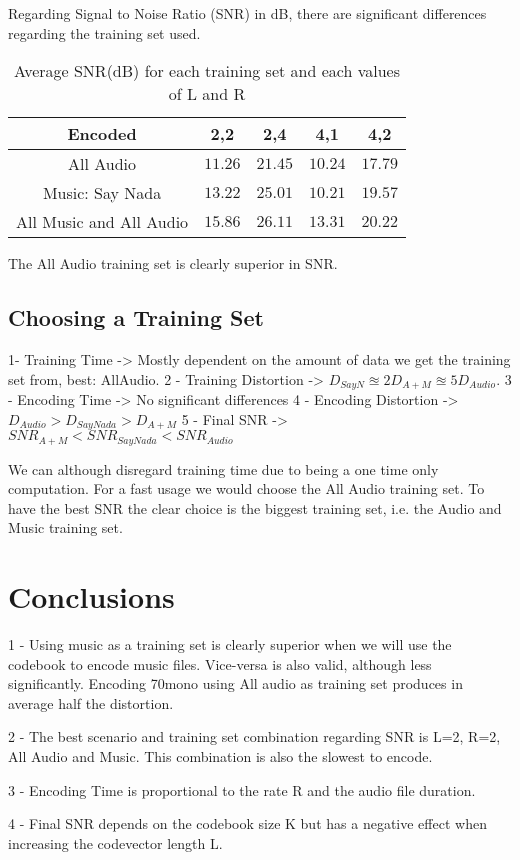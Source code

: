 \documentclass[a4paper, 11pt]{article}
\begin{document}
		Regarding Signal to Noise Ratio (SNR) in dB, there are significant differences regarding the training set used.
		
		\begin{table}[H]
			\centering
			\begin{tabular}{c|c|c|c|c}
				\textbf{Encoded} 			& \textbf{2,2} 	& \textbf{2,4}	& \textbf{4,1}	& \textbf{4,2} \\ \hline
				All Audio 					& $ 11.26 $ 	& $ 21.45 $		& $ 10.24 $ 	& $ 17.79 $	\\ \hline
				Music: Say Nada				& $ 13.22 $		& $ 25.01 $		& $ 10.21 $ 	& $ 19.57 $	\\ \hline
				All Music and All Audio 	& $ 15.86 $		& $	26.11 $		& $ 13.31 $		& $	20.22 $	\\
			\end{tabular}
			\caption{Average SNR(dB) for each training set and each values of L and R}
			\label{table:EncodeSNRT}
		\end{table}
		
		The All Audio training set is clearly superior in SNR.
		
		\subsection{Choosing a Training Set}
			1- Training Time -> Mostly dependent on the amount of data we get the training set from, best: AllAudio.
			2 - Training Distortion -> $ D_{SayN} \approxeq 2 D_{A+M} \approxeq 5 D_{Audio} $.
			3 - Encoding Time -> No significant differences
			4 - Encoding Distortion -> $  D_{Audio} > D_{SayNada} > D_{A+M} $
			5 - Final SNR -> $  SNR_{A+M} < SNR_{SayNada} < SNR_{Audio} $
			
			We can although disregard training time due to being a one time only computation.
			For a fast usage we would choose the All Audio training set.
			To have the best SNR the clear choice is the biggest training set, i.e. the Audio and Music training set.
			
	
	\section{Conclusions}
	
		1 - Using music as a training set is clearly superior when we will use the codebook to encode music files.
			Vice-versa is also valid, although less significantly. Encoding 70mono using All audio as training set produces in average half the distortion.
		
		2 - The best scenario and training set combination regarding SNR is L=2, R=2, All Audio and Music. This combination is also the slowest to encode.
		
		3 - Encoding Time is proportional to the rate R and the audio file duration.
		
		4 - Final SNR depends on the codebook size K but has a negative effect when increasing the codevector length L.
		
		
		
		
		
		
		
		
\end{document}
